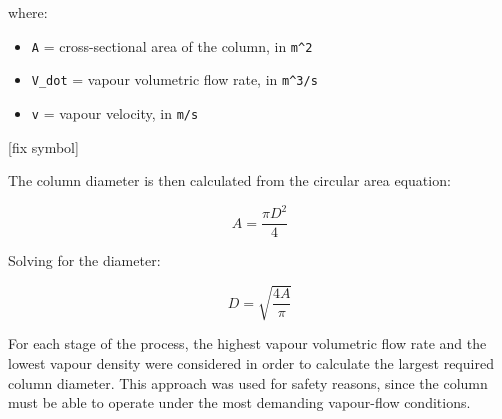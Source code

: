 where:

\begin{itemize}
\tightlist
\item
  \texttt{A} = cross-sectional area of the column, in \texttt{m\^{}2}
\item
  \texttt{V\_dot} = vapour volumetric flow rate, in \texttt{m\^{}3/s}
\item
  \texttt{v} = vapour velocity, in \texttt{m/s}
\end{itemize}

{[}fix symbol{]}

The column diameter is then calculated from the circular area equation:

\begin{equation}{ A = \frac{\pi D^2}{4} }\end{equation}

Solving for the diameter:

\begin{equation}{ D = \sqrt{\frac{4A}{\pi}} }\end{equation}

For each stage of the process, the highest vapour volumetric flow rate
and the lowest vapour density were considered in order to calculate the
largest required column diameter. This approach was used for safety
reasons, since the column must be able to operate under the most
demanding vapour-flow conditions.

